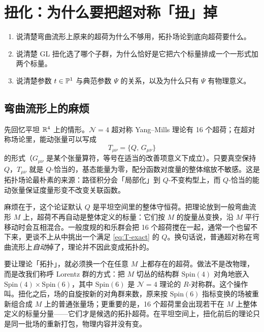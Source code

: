 \section{扭化：为什么要把超对称「扭」掉}
\label{sec:twist}

\begin{goals}
\begin{enumerate}
\item 说清楚弯曲流形上原来的超荷为什么不够用，拓扑场论到底向超荷要什么。
\item 说清楚 GL 扭化选了哪个子群，为什么恰好是它把六个标量排成一个一形式加两个标量。
\item 说清楚参数 $t\in\mathbb{P}^1$ 与典范参数 $\Psi$ 的关系，以及为什么只有 $\Psi$ 有物理意义。
\end{enumerate}
\end{goals}

\subsection{弯曲流形上的麻烦}

先回忆平坦 $\mathbb{R}^4$ 上的情形。$\mathcal N=4$ 超对称 Yang--Mills 理论有 16 个超荷；在超对称场论里，能动张量可以写成
\begin{equation}
T_{\mu\nu}=\{Q,\,G_{\mu\nu}\}
\label{eq:T-exact}
\end{equation}
的形式（$G_{\mu\nu}$ 是某个张量算符，等号在适当的改善项意义下成立）。只要真空保持 $Q$，$T_{\mu\nu}$ 就是 $Q$-恰当的，基态能量为零，配分函数对度量的整体缩放不敏感。这是拓扑场论最朴素的来源：路径积分会「局部化」到 $Q$-不变构型上，而 $Q$-恰当的能动张量保证度量形变不改变关联函数。

麻烦在于，这个论证默认 $Q$ 是平坦空间里的整体守恒荷。把理论放到一般弯曲流形 $M$ 上，超荷不再自动是整体定义的标量：它们按 $M$ 的旋量丛变换，沿 $M$ 平行移动时会互相混合。一般度规的和乐群会把 16 个超荷搅在一起，通常一个也留不下来，更谈不上从中挑出一个满足 \eqref{eq:T-exact} 的 $Q$。换句话说，普通超对称在弯曲流形上\emph{自动}掉了，理论并不因此变成拓扑的。

要让理论「拓扑」，就必须换一个在任意 $M$ 上都存在的超荷。做法不是改物理，而是改我们称呼 Lorentz 群的方式：把 $M$ 切丛的结构群 $\mathrm{Spin}(4)$ 对角地嵌入 $\mathrm{Spin}(4)\times\mathrm{Spin}(6)$，其中 $\mathrm{Spin}(6)$ 是 $\mathcal N=4$ 理论的 $R$-对称群。这个操作叫。扭化之后，场的自旋按新的对角群来数，原来按 $\mathrm{Spin}(6)$ 指标变换的场被重新组合成 $M$ 上的普通张量场；更重要的是，16 个超荷里会出现若干在 $M$ 上整体定义的标量分量——它们才是候选的拓扑超荷。在平坦空间上，扭化前后的理论只是同一批场的重新打包，物理内容并没有变。

